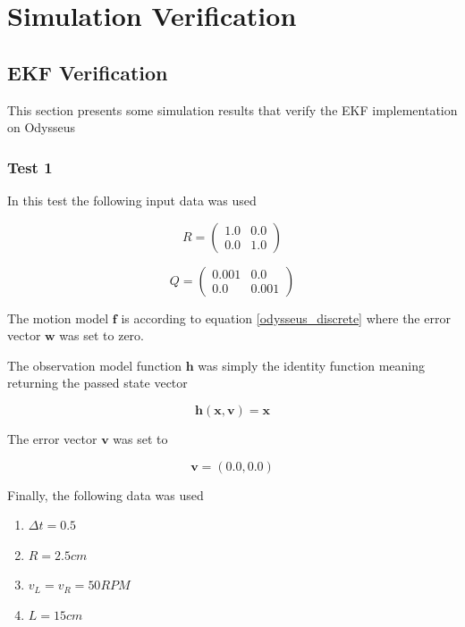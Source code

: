 \section{Simulation Verification}


\subsection{EKF Verification}
This section presents some simulation results that verify the EKF implementation on Odysseus

\subsubsection{Test 1}

In this test the following input data was used

\begin{equation}
R = 
\begin{pmatrix}
 1.0 & 0.0 \\
0.0 & 1.0 
\end{pmatrix}
\end{equation}

\begin{equation}
Q = 
\begin{pmatrix}
0.001 & 0.0 \\
0.0 & 0.001 
\end{pmatrix}
\end{equation}

The motion model $\mathbf{f}$ is according to equation \ref{odysseus_discrete} where the error vector $\mathbf{w}$ was set to zero.

The observation model function $\mathbf{h}$ was simply the identity function meaning returning the passed state vector

\begin{equation}
\mathbf{h}(\mathbf{x}, \mathbf{v}) = \mathbf{x}
\end{equation}

The error vector $\mathbf{v}$ was set to

\begin{equation}
\mathbf{v} = (0.0, 0.0)
\end{equation}

Finally, the following data was used

\begin{enumerate}
	\item $\Delta t = 0.5$
	\item $R = 2.5 cm$
	\item $v_L = v_R = 50 RPM$
	\item $L= 15 cm$ 
\end{enumerate}


